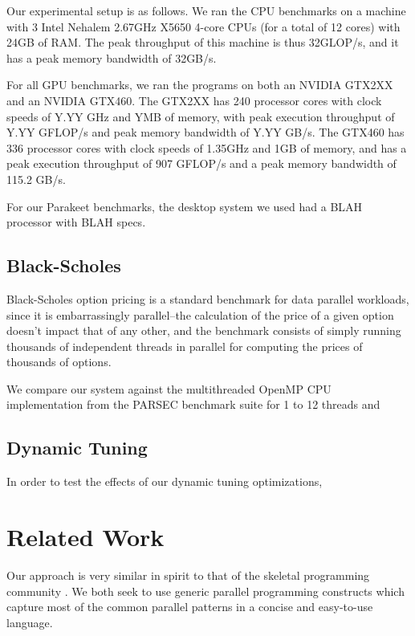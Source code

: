 \documentclass[preprint]{sigplanconf}
\begin{document}
Our experimental setup is as follows.  We ran the CPU benchmarks on a machine
with 3 Intel Nehalem 2.67GHz X5650 4-core CPUs (for a total of 12 cores) with
24GB of RAM.  The peak throughput of this machine is thus 32GLOP/s, and it has
a peak memory bandwidth of 32GB/s.

For all GPU benchmarks, we ran the programs on both an NVIDIA GTX2XX and an
NVIDIA GTX460.  The GTX2XX has 240 processor cores with clock speeds of
Y.YY GHz and YMB of memory, with peak execution throughput of Y.YY GFLOP/s and
peak memory bandwidth of Y.YY GB/s.  The GTX460 has 336 processor cores with
clock speeds of 1.35GHz and 1GB of memory, and has a peak execution throughput
of 907 GFLOP/s and a peak memory bandwidth of 115.2 GB/s.

For our Parakeet benchmarks, the desktop system we used had a BLAH processor
with BLAH specs.

\subsection{Black-Scholes}
Black-Scholes option pricing \cite{Blac73} is a standard benchmark for data
parallel workloads, since it is embarrassingly parallel--the calculation of the
price of a given option doesn't impact that of any other, and the benchmark
consists of simply running thousands of independent threads in parallel for
computing the prices of thousands of options.

We compare our system against the multithreaded OpenMP CPU implementation
from the PARSEC \cite{Bien08} benchmark suite for 1 to 12 threads and 


\subsection{Dynamic Tuning}
In order to test the effects of our dynamic tuning optimizations, 

\section{Related Work}
\label{RelatedWork}

Our approach is very similar in spirit to that of the skeletal programming
community \cite{Cole04}.  We both seek to use generic parallel programming
constructs which capture most of the common parallel patterns in a concise and
easy-to-use language.  
\end{document}
